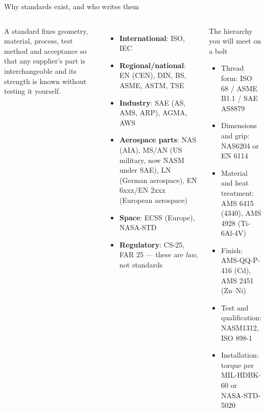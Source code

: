 \documentclass[aspectratio=169,10pt]{beamer}
\begin{document}
\begin{frame}{Why standards exist, and who writes them}
\footnotesize
\begin{columns}[T]
A standard fixes \alert{geometry, material, process, test method and acceptance} so that any supplier's part is interchangeable and its strength is known without testing it yourself.
\begin{itemize}
  \item \textbf{International}: ISO, IEC
  \item \textbf{Regional/national}: EN (CEN), DIN, BS, ASME, ASTM, TSE
  \item \textbf{Industry}: SAE (AS, AMS, ARP), AGMA, AWS
  \item \textbf{Aerospace parts}: NAS (AIA), MS/AN (US military, now NASM under SAE), LN (German aerospace), EN 6xxx/EN 2xxx (European aerospace)
  \item \textbf{Space}: ECSS (Europe), NASA-STD
  \item \textbf{Regulatory}: CS-25, FAR 25 --- these are \emph{law}, not standards
\end{itemize}
\begin{block}{The hierarchy you will meet on a bolt}
\begin{itemize}
  \item Thread form: ISO 68 / ASME B1.1 / SAE AS8879
  \item Dimensions and grip: NAS6204 or EN 6114
  \item Material and heat treatment: AMS 6415 (4340), AMS 4928 (Ti-6Al-4V)
  \item Finish: AMS-QQ-P-416 (Cd), AMS 2451 (Zn--Ni)
  \item Test and qualification: NASM1312, ISO 898-1
  \item Installation: torque per MIL-HDBK-60 or NASA-STD-5020
\end{itemize}
\end{block}
\end{columns}
\end{frame}
\end{document}
